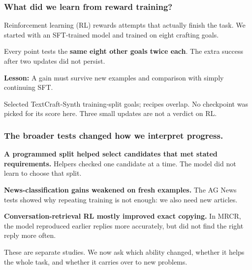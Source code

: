 \documentclass[aspectratio=169,12pt]{beamer}
\newcommand{\aside}[1]{\vfill{\footnotesize\color{Gray}#1\par}}
\begin{document}
\begin{frame}[t]
\frametitle{What did we learn from reward training?}
Reinforcement learning (RL) rewards attempts that actually finish the task.
We started with an SFT-trained model and trained on eight crafting goals.
\begin{center}
\end{center}
{\small Every point tests the \textbf{same eight other goals twice each}. The extra success after two updates did not persist.}
\medskip

\textbf{Lesson:} A gain must survive new examples and comparison with simply continuing SFT.
\aside{Selected TextCraft-Synth training-split goals; recipes overlap. No checkpoint was picked for its score here. Three small updates are not a verdict on RL.}
\end{frame}

\begin{frame}[t]
\frametitle{The broader tests changed how we interpret progress.}
\textbf{A programmed split helped select candidates that met stated requirements.}
Helpers checked one candidate at a time. The model did not learn to choose that split.
\medskip

\textbf{News-classification gains weakened on fresh examples.}
The AG News tests showed why repeating training is not enough: we also need new articles.
\medskip

\textbf{Conversation-retrieval RL mostly improved exact copying.}
In MRCR, the model reproduced earlier replies more accurately, but did not find the right reply more often.
\aside{These are separate studies. We now ask which ability changed, whether it helps the whole task, and whether it carries over to new problems.}
\end{frame}
\end{document}
